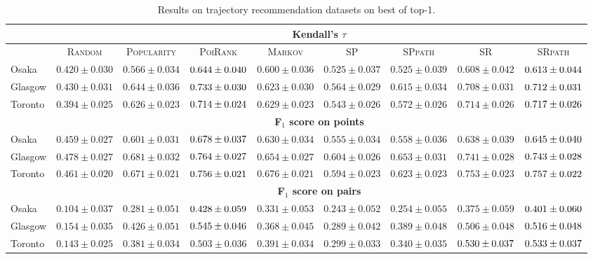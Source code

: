 \begin{table*}[!h]
\centering
\small
\setlength{\tabcolsep}{3pt} %
\begin{tabular}{l|cc|ccc|ccc} \hline
& \multicolumn{8}{c}{\bf Kendall's $\tau$} \\ \hline
 & \textsc{Random} & \textsc{Popularity} & \textsc{PoiRank} & \textsc{Markov} & \textsc{SP} & \textsc{SPpath} & \textsc{SR} & \textsc{SRpath} \\ \hline
Osaka & $0.420\pm0.030$ & $0.566\pm0.034$ & $\cellcolor{green!25}{0.644\pm0.040}$ & $0.600\pm0.036$ & $0.525\pm0.037$ & $0.525\pm0.039$ & $0.608\pm0.042$ & $\cellcolor{yellow!25}{0.613\pm0.044}$ \\
Glasgow & $0.430\pm0.031$ & $0.644\pm0.036$ & $\cellcolor{green!25}{0.733\pm0.030}$ & $0.623\pm0.030$ & $0.564\pm0.029$ & $0.615\pm0.034$ & $0.708\pm0.031$ & $\cellcolor{yellow!25}{0.712\pm0.031}$ \\
Toronto & $0.394\pm0.025$ & $0.626\pm0.023$ & $\cellcolor{yellow!25}{0.714\pm0.024}$ & $0.629\pm0.023$ & $0.543\pm0.026$ & $0.572\pm0.026$ & $0.714\pm0.026$ & $\cellcolor{green!25}{0.717\pm0.026}$ \\
\hline
& \multicolumn{8}{c}{\bf F$_1$ score on points} \\ \hline
Osaka & $0.459\pm0.027$ & $0.601\pm0.031$ & $\cellcolor{green!25}{0.678\pm0.037}$ & $0.630\pm0.034$ & $0.555\pm0.034$ & $0.558\pm0.036$ & $0.638\pm0.039$ & $\cellcolor{yellow!25}{0.645\pm0.040}$ \\
Glasgow & $0.478\pm0.027$ & $0.681\pm0.032$ & $\cellcolor{green!25}{0.764\pm0.027}$ & $0.654\pm0.027$ & $0.604\pm0.026$ & $0.653\pm0.031$ & $0.741\pm0.028$ & $\cellcolor{yellow!25}{0.743\pm0.028}$ \\
Toronto & $0.461\pm0.020$ & $0.671\pm0.021$ & $\cellcolor{yellow!25}{0.756\pm0.021}$ & $0.676\pm0.021$ & $0.594\pm0.023$ & $0.623\pm0.023$ & $0.753\pm0.023$ & $\cellcolor{green!25}{0.757\pm0.022}$ \\
\hline
& \multicolumn{8}{c}{\bf F$_1$ score on pairs} \\ \hline
Osaka & $0.104\pm0.037$ & $0.281\pm0.051$ & $\cellcolor{green!25}{0.428\pm0.059}$ & $0.331\pm0.053$ & $0.243\pm0.052$ & $0.254\pm0.055$ & $0.375\pm0.059$ & $\cellcolor{yellow!25}{0.401\pm0.060}$ \\
Glasgow & $0.154\pm0.035$ & $0.426\pm0.051$ & $\cellcolor{green!25}{0.545\pm0.046}$ & $0.368\pm0.045$ & $0.289\pm0.042$ & $0.389\pm0.048$ & $0.506\pm0.048$ & $\cellcolor{yellow!25}{0.516\pm0.048}$ \\
Toronto & $0.143\pm0.025$ & $0.381\pm0.034$ & $0.503\pm0.036$ & $0.391\pm0.034$ & $0.299\pm0.033$ & $0.340\pm0.035$ & $\cellcolor{yellow!25}{0.530\pm0.037}$ & $\cellcolor{green!25}{0.533\pm0.037}$ \\
\hline
\end{tabular}
\caption{Results on trajectory recommendation datasets on best of top-1.}
\end{table*}


